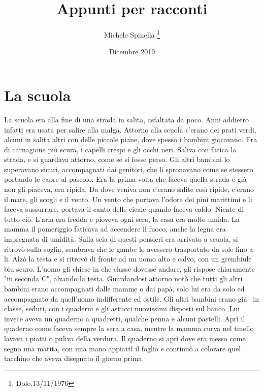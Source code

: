 \documentclass[12pt, a4paper]{article}
\author{Michele Spinella \thanks{Dolo,13/11/1976}}
\date{Dicembre 2019}
\title{Appunti per racconti}
\begin{document}
\ttfamily
\onehalfspacing


\section*{La scuola}
La scuola era alla fine di una strada in salita, asfaltata da poco. Anni addietro infatti era usata per salire alla malga. Attorno alla scuola c'erano dei prati verdi, alcuni in salita  altri con delle piccole piane, dove spesso i bambini giocavano.
Era di carnagione più scura, i capelli crespi e gli occhi neri. Saliva con fatica la strada, e si guardava attorno, come se si fosse perso. Gli altri bambini lo superavano sicuri, accompagnati dai genitori, che li spronavano  come se stessero portando le capre al pascolo.
Era la prima volta che faceva quella strada e già non gli piaceva, era ripida.
Da dove veniva non c'erano salite così ripide, c'erano il mare, gli scogli e il vento. Un vento che portava l'odore dei pini marittimi e li faceva sussurrare, portava il canto delle cicale quando faceva caldo.
Niente di tutto ciò. L'aria era fredda e pioveva ogni sera, la casa era molto umida. La mamma il pomeriggio faticava ad accendere il fuoco, anche la legna era impregnata di umidità.
\newline
Sulla scia di questi pensieri era arrivato a scuola, si ritrovò sulla soglia, sembrava che le gambe lo avessero trasportato da sole fino a li. Alzò la testa e si ritrovò di fronte ad un uomo alto e calvo, con un grembiule blu scuro. L'uomo gli chiese in che classe dovesse andare, gli rispose chiaramente "in seconda C", alzando la testa.
Guardandosi attorno notò che tutti gli altri bambini erano accompagnati dalle mamme o dai papà, solo lui era da solo ed accompagnato da quell'uomo indifferente ed ostile.\newline
Gli altri bambini erano già  in classe, seduti, con i quaderni e gli astucci nuovissimi disposti sul banco. Lui invece aveva un quaderno a quadretti, qualche penna e alcuni pastelli. Aprì il quaderno come faceva sempre la sera a casa, mentre la mamma curva nel tinello lavava i piatti o puliva della verdura. Il quaderno si aprì dove era messo come segno una matita,  con una mano appiattì il foglio e continuò a colorare quel tacchino che aveva disegnato il giorno prima.
\end{document}
